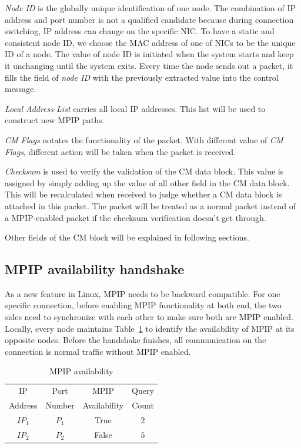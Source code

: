 \emph{Node ID} is the globally unique identification of one node. The combination of IP address and port number is not a qualified candidate because during connection switching, IP address can change on the specific NIC. To have a static and consistent node ID, we choose the MAC address of one of NICs to be the unique ID of a node. 
The value of node ID is initiated when the system starts and keep it unchanging until the system exits. Every time the node sends out a packet, it fills the field of \emph{node ID} with the previously extracted value into the control message.

\emph{Local Address List} carries all local IP addresses. This list will be used to construct new MPIP paths.

\emph{CM Flags} notates the functionality of the packet. With different value of \emph{CM Flags}, different action will be taken when the packet is received. 

\emph{Checksum} is used to verify the validation of the CM data block. This value is assigned by simply adding up the value of all other field in the CM data block. This will be recalculated when received to judge whether a CM data block is attached in this packet. The packet will be treated as a normal packet instead of a MPIP-enabled packet if the checksum verification doesn't get through.

Other fields of the CM block will be explained in following sections.

\subsection{MPIP availability handshake}

As a new feature in Linux, MPIP needs to be backward compatible. For one specific connection, before enabling MPIP functionality at both end, the two sides need to synchronize with each other to make sure both are MPIP enabled. Locally, every node maintains Table~\ref{tb.me} to identify the availability of MPIP at its opposite nodes. Before the handshake finishes, all communication on the connection is normal traffic without MPIP enabled.

\begin{table}[htbp]
\caption{\label{tb.me}MPIP availability}
\centering
\begin{tabular}{|c|c|c|c|}
\hline
IP 		& Port 	 & MPIP 		   & Query\\
Address & Number & Availability & Count\\
\hline
${IP}_{1}$ & ${P}_{1}$ & True  & $2$ \\
\hline
${IP}_{2}$ & ${P}_{2}$ & False & $5$ \\
\hline
\end{tabular}
\end{table}


